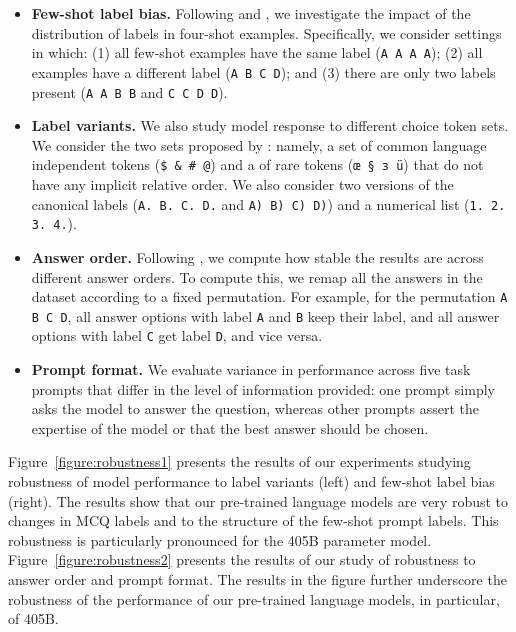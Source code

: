 \documentclass[dvipsnames]{fairmeta}
\begin{document}
\begin{itemize}

\item \textbf{Few-shot label bias.}
Following \citet{zheng2023large} and \citet{weber-etal-2023-mind}, we investigate the impact of the distribution of labels in four-shot examples.
Specifically, we consider settings in which: (1) all few-shot examples have the same label (\texttt{A A A A}); (2) all examples have a different label (\texttt{A B C D}); and (3) there are only two labels present (\texttt{A A B B} and \texttt{C C D D}).

\item \textbf{Label variants.} 
We also study model response to different choice token sets.
We consider the two sets proposed by \citet{alzahrani2024when}: namely, a set of common language independent tokens (\texttt{\$ \& \# @}) and a of rare tokens (\texttt{œ § \foreignlanguage{russian}{з} ü}) that do not have any implicit relative order.
We also consider two versions of the canonical labels (\texttt{A. B. C. D.} and \texttt{A) B) C) D)}) and a numerical list (\texttt{1. 2. 3. 4.}).

\item \textbf{Answer order.}
Following \citet{wang2024beyond}, we compute how stable the results are across different answer orders.
To compute this, we remap all the answers in the dataset according to a fixed permutation.
For example, for the permutation \texttt{A B C D}, all answer options with label \texttt{A} and \texttt{B} keep their label, and all answer options with label \texttt{C} get label \texttt{D}, and vice versa.

\item \textbf{Prompt format.}
We evaluate variance in performance across five task prompts that differ in the level of information provided: one prompt simply asks the model to answer the question, whereas other prompts assert the expertise of the model or that the best answer should be chosen.

\end{itemize}

Figure~\ref{figure:robustness1} presents the results of our experiments studying robustness of model performance to label variants (left) and few-shot label bias (right). 
The results show that our pre-trained language models are very robust to changes in MCQ labels and to the structure of the few-shot prompt labels.
This robustness is particularly pronounced for the 405B parameter model.
Figure~\ref{figure:robustness2} presents the results of our study of robustness to answer order and prompt format.
The results in the figure further underscore the robustness of the performance of our pre-trained language models, in particular, of \llamathree 405B.
\end{document}
